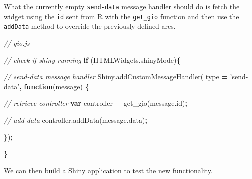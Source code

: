 \documentclass[10pt,]{krantz}
\makeatletter
\newenvironment{Shaded}{\begin{snugshade}}{\end{snugshade}}
\newcommand{\AttributeTok}[1]{\textcolor[rgb]{0.61,0.61,0.61}{#1}}
\newcommand{\CommentTok}[1]{\textcolor[rgb]{0.37,0.37,0.37}{\textit{#1}}}
\newcommand{\ControlFlowTok}[1]{\textcolor[rgb]{0.27,0.27,0.27}{\textbf{#1}}}
\newcommand{\KeywordTok}[1]{\textcolor[rgb]{0.27,0.27,0.27}{\textbf{#1}}}
\newcommand{\NormalTok}[1]{#1}
\newcommand{\OperatorTok}[1]{\textcolor[rgb]{0.43,0.43,0.43}{\textbf{#1}}}
\newcommand{\StringTok}[1]{\textcolor[rgb]{0.5,0.5,0.5}{#1}}
\newcommand{\VariableTok}[1]{\textcolor[rgb]{0,0,0}{#1}}
\newenvironment{kframe}{%
\medskip{}
\setlength{\fboxsep}{.8em}
 \def\at@end@of@kframe{}%
 \ifinner\ifhmode%
  \def\at@end@of@kframe{\end{minipage}}%
  \begin{minipage}{\columnwidth}%
 \fi\fi%
 \def\FrameCommand##1{\hskip\@totalleftmargin \hskip-\fboxsep
 \colorbox{shadecolor}{##1}\hskip-\fboxsep
     \hskip-\linewidth \hskip-\@totalleftmargin \hskip\columnwidth}%
 \MakeFramed {\advance\hsize-\width
   \@totalleftmargin\z@ \linewidth\hsize
   \@setminipage}}%
 {\par\unskip\endMakeFramed%
 \at@end@of@kframe}
\renewenvironment{Shaded}{\begin{kframe}}{\end{kframe}}
\makeatother
\begin{document}
What the currently empty \texttt{send-data} message handler should do is fetch the widget using the \texttt{id} sent from R with the \texttt{get\_gio} function and then use the \texttt{addData} method to override the previously-defined arcs.

\begin{Shaded}
\begin{Highlighting}[]
\CommentTok{// gio.js}

\CommentTok{// check if shiny running}
\ControlFlowTok{if}\NormalTok{ (}\VariableTok{HTMLWidgets}\NormalTok{.}\AttributeTok{shinyMode}\NormalTok{)}\OperatorTok{\{}

  \CommentTok{// send-data message handler}
  \VariableTok{Shiny}\NormalTok{.}\AttributeTok{addCustomMessageHandler}\NormalTok{(}
\NormalTok{    type }\OperatorTok{=} \StringTok{'send-data'}\OperatorTok{,} \KeywordTok{function}\NormalTok{(message) }\OperatorTok{\{}

    \CommentTok{// retrieve controller}
    \KeywordTok{var}\NormalTok{ controller }\OperatorTok{=} \AttributeTok{get_gio}\NormalTok{(}\VariableTok{message}\NormalTok{.}\AttributeTok{id}\NormalTok{)}\OperatorTok{;}

    \CommentTok{// add data}
    \VariableTok{controller}\NormalTok{.}\AttributeTok{addData}\NormalTok{(}\VariableTok{message}\NormalTok{.}\AttributeTok{data}\NormalTok{)}\OperatorTok{;}

  \OperatorTok{\}}\NormalTok{)}\OperatorTok{;}

\OperatorTok{\}}
\end{Highlighting}
\end{Shaded}

We can then build a Shiny application to test the new functionality.
\end{document}
